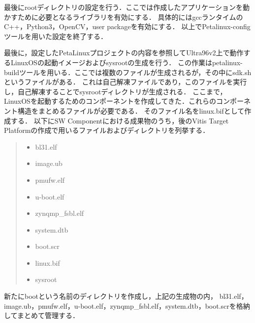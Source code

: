 \documentclass[11pt,a4j]{jreport}
\begin{document}
最後にrootディレクトリの設定を行う．ここでは作成したアプリケーションを動かすために必要となるライブラリを有効にする．
具体的にはgccランタイムのC++，Python3，OpenCV，user packageを有効にする．
以上でPetalinux-configツールを用いた設定を終了する．

最後に，設定したPetaLinuxプロジェクトの内容を参照してUltra96v2上で動作するLinuxOSの起動イメージおよびsysrootの生成を行う．
この作業はpetalinux-buildツールを用いる．ここでは複数のファイルが生成されるが，その中にsdk.shというファイルがある．
これは自己解凍ファイルであり，このファイルを実行し，自己解凍することでsysrootディレクトリが生成される．
ここまで，LinuxOSを起動するためのコンポーネントを作成してきた．これらのコンポーネント構造をまとめるファイルが必要である．
そのファイル名をlinux.bifとして作成する．
以下にSW Componentにおける成果物のうち，後のVitis Target Platformの作成で用いるファイルおよびディレクトリを列挙する．
\begin{quote}
  \begin{itemize}
    \item bl31.elf
    \item image.ub
    \item pmufw.elf
    \item u-boot.elf
    \item zynqmp_fsbl.elf
    \item system.dtb
    \item boot.scr
    \item linux.bif
    \item sysroot
  \end{itemize}
\end{quote}
新たにbootという名前のディレクトリを作成し，上記の生成物の内，
bl31.elf，image.ub，pmufw.elf，u-boot.elf，zynqmp_fsbl.elf，system.dtb，boot.scrを格納してまとめて管理する．
\end{document}
